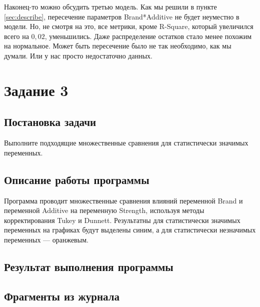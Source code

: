 \documentclass[12pt,a4paper]{article}
\begin{document}
  Наконец-то можно обсудить третью модель.
  Как мы решили в пункте \ref{sec:describe}, пересечение параметров Brand*Additive не будет неуместно в модели.
  Но, не смотря на это, все метрики, кроме R-Square, который увеличился всего на $0,02$, уменьшились.
  Даже распределение остатков стало менее похожим на нормальное.
  Может быть пересечение было не так необходимо, как мы думали.
  Или у нас просто недостаточно данных.

  \newpage
  \section{Задание 3}
  \subsection{Постановка задачи}
  Выполните подходящие множественные сравнения для статистически значимых переменных.

  \subsection{Описание работы программы}
  Программа проводит множественные сравнения влияний переменной Brand и переменной Additive на переменную Strength,
  используя методы корректирования Tukey и Dunnett.
  Результатны для статистически значимых переменных на графиках будут выделены синим,
  а для статистически незначимых переменных --- оранжевым.

  \subsection{Результат выполнения программы}

  \subsection{Фрагменты из журнала}
\end{document}
